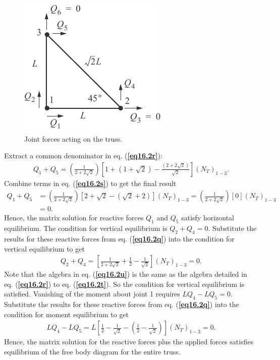 \documentclass{AeroStructure-ERJohnson}
\begin{document}
\begin{example}
\begin{figure}
\includegraphics{Figure_16-5.pdf}
\caption{Joint forces acting on the truss. \label{fig16.5}}
\vspace*{-1pc}
\end{figure}

\noindent Extract a common denominator in eq. (\textbf{\ref{eq16.2r}}):
\begin{align}\label{eq16.2s}\tag{s}
Q_{1}+Q_{5}=\left(\frac{1}{2+2 \sqrt{2}}\right)\left[1+(1+\sqrt{2})-\frac{(2+2 \sqrt{2})}{\sqrt{2}}\right]\left(N_{T}\right)_{1-3}.
\end{align}
Combine terms in eq. (\textbf{\ref{eq16.2s}}) to get the final result
\begin{align}
Q_{1}+Q_{5}&=\left(\frac{1}{2+2 \sqrt{2}}\right)[2+\sqrt{2}-(\sqrt{2}+2)]\left(N_{T}\right)_{1-3}=\left(\frac{1}{2+2 \sqrt{2}}\right)[0]\left(N_{T}\right)_{1-3} \nonumber\\
&=0. \label{eq16.2t}\tag{t}
\end{align}
Hence, the matrix solution for reactive forces $Q_1$ and $Q_5$ satisfy horizontal equilibrium. The condition for vertical equilibrium is $Q_{2}+Q_{4}=0$. Substitute the results for these reactive forces from eq. (\textbf{\ref{eq16.2q}}) into the condition for vertical equilibrium to get
\begin{align}\label{eq16.2u}\tag{u}
Q_{2}+Q_{4}=\left[\frac{1}{2+2 \sqrt{2}}+\frac{1}{2}-\frac{1}{\sqrt{2}}\right]\left(N_{T}\right)_{1-3}=0.
\end{align}
Note that the algebra in eq. (\textbf{\ref{eq16.2u}}) is the same as the algebra detailed in eq. (\textbf{\ref{eq16.2r}}) to eq. (\textbf{\ref{eq16.2t}}). So the condition for vertical equilibrium is satisfied. Vanishing of the moment about joint 1 requires $L Q_{4}-L Q_{5}=0$. Substitute the results for these reactive forces from eq. (\textbf{\ref{eq16.2q}}) into the condition for moment equilibrium to get
\begin{align}\label{eq16.2v}\tag{v}
L Q_{4}-L Q_{5}=L\left[\frac{1}{2}-\frac{1}{\sqrt{2}}-\left(\frac{1}{2}-\frac{1}{\sqrt{2}}\right)\right]\left(N_{T}\right)_{1-3}=0.
\end{align}
Hence, the matrix solution for the reactive forces plus the applied forces satisfies equilibrium of the free body diagram for the entire truss.


\end{example}
\end{document}
